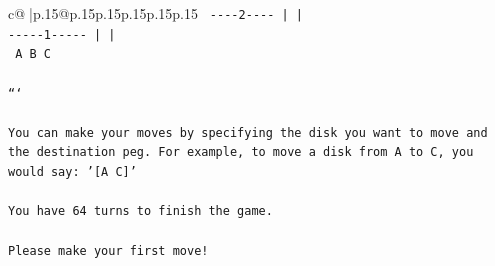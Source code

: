 \documentclass{article}
\begin{document}
{\begin{supertabular}{c@{$\;$}|p{.15\linewidth}@{}p{.15\linewidth}p{.15\linewidth}p{.15\linewidth}p{.15\linewidth}p{.15\linewidth}}
{{{\texttt{ {-}{-}{-}{-}2{-}{-}{-}{-}       |           |     } \\
\texttt{{-}{-}{-}{-}{-}1{-}{-}{-}{-}{-}      |           |     } \\
\texttt{     A           B           C     } \\
\\ 
\texttt{```} \\
\\ 
\texttt{You can make your moves by specifying the disk you want to move and the destination peg. For example, to move a disk from A to C, you would say: '{[}A C{]}'} \\
\\ 
\texttt{You have 64 turns to finish the game.} \\
\\ 
\texttt{Please make your first move!} \\
            }
        }
    }
     \\ \\


\end{supertabular}}
\end{document}
